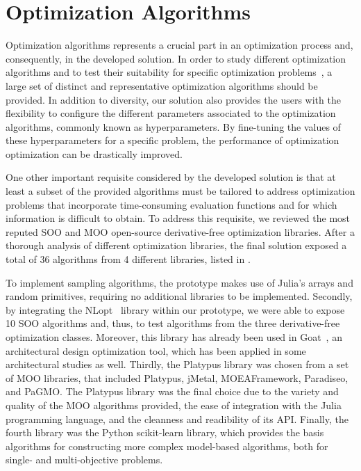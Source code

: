 \section{Optimization Algorithms}

Optimization algorithms represents a crucial part in an optimization process and, consequently, in the developed solution. In order to study different optimization algorithms and to test their suitability for specific optimization problems~\cite{Wolpert1997NFLT}, a large set of distinct and representative optimization algorithms should be provided. In addition to diversity, our solution also provides the users with the flexibility to configure the different parameters associated to the optimization algorithms, commonly known as hyperparameters. By fine-tuning the values of these hyperparameters for a specific problem, the performance of optimization optimization can be drastically improved. 

One other important requisite considered by the developed solution is that at least a subset of the provided algorithms must be tailored to address optimization problems that incorporate time-consuming evaluation functions and for which information is difficult to obtain. To address this requisite, we reviewed the most reputed \ac{SOO} and \ac{MOO} open-source derivative-free optimization libraries. After a thorough analysis of different optimization libraries, the final solution exposed a total of 36 algorithms from 4 different libraries, listed in . 

To implement sampling algorithms, the prototype makes use of Julia's arrays and random primitives, requiring no additional libraries to be implemented. Secondly, by integrating the NLopt~\cite{NLOPT} library within our prototype, we were able to expose 10 \ac{SOO} algorithms and, thus, to test algorithms from the three derivative-free optimization classes. Moreover, this library has already been used in Goat~\cite{GOAT}, an architectural design optimization tool, which has been applied in some architectural studies as well. Thirdly, the Platypus library was chosen from a set of \ac{MOO} libraries, that included Platypus, jMetal, MOEAFramework, Paradiseo, and PaGMO. The Platypus library was the final choice due to the variety and quality of the \ac{MOO} algorithms provided, the ease of integration with the Julia programming language, and the cleanness and readibility of its \ac{API}. Finally, the fourth library was the Python scikit-learn library, which provides the basis algorithms for constructing more complex model-based algorithms, both for single- and multi-objective problems.

